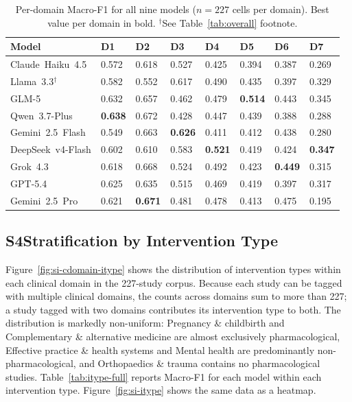 \documentclass[../main.tex]{subfiles}
\begin{document}
\begin{table}
\centering
\caption{Per-domain Macro-F1 for all nine models
($n = 227$ cells per domain). Best value per domain in bold.
$^\dag$See Table~\ref{tab:overall} footnote.}
\label{tab:domain-f1}
\begin{tabular}{lC{1.5cm}C{1.5cm}C{1.5cm}C{1.5cm}C{1.5cm}C{1.5cm}C{1.5cm}}
\toprule
Model & D1 & D2 & D3 & D4 & D5 & D6 & D7 \\
\midrule
Claude~Haiku~4.5       & 0.572 & 0.618 & 0.527          & 0.425 & 0.394 & 0.387 & 0.269 \\
Llama~3.3$^\dag$   & 0.582 & 0.552 & 0.617          & 0.490 & 0.435 & 0.397 & 0.329 \\
GLM-5                  & 0.632 & 0.657 & 0.462          & 0.479 & \textbf{0.514} & 0.443 & 0.345 \\
Qwen~3.7-Plus      & \textbf{0.638} & 0.672 & 0.428 & 0.447 & 0.439 & 0.388 & 0.288 \\
Gemini~2.5~Flash   & 0.549 & 0.663 & \textbf{0.626} & 0.411 & 0.412 & 0.438 & 0.280 \\
DeepSeek~v4-Flash  & 0.602 & 0.610 & 0.583          & \textbf{0.521} & 0.419 & 0.424 & \textbf{0.347} \\
Grok~4.3           & 0.618 & 0.668 & 0.524          & 0.492 & 0.423 & \textbf{0.449} & 0.315 \\
GPT-5.4            & 0.625 & 0.635 & 0.515          & 0.469 & 0.419 & 0.397 & 0.317 \\
Gemini~2.5~Pro     & 0.621 & \textbf{0.671} & 0.481  & 0.478 & 0.413 & 0.475 & 0.195 \\
\bottomrule
\end{tabular}
\end{table}

\subsection*{S4\quad Stratification by Intervention Type}
\label{sec:si-itype}

Figure~\ref{fig:si-cdomain-itype} shows the distribution of intervention types
within each clinical domain in the 227-study corpus.
Because each study can be tagged with multiple clinical domains, the counts
across domains sum to more than 227; a study tagged with two domains contributes
its intervention type to both.
The distribution is markedly non-uniform: Pregnancy \& childbirth and
Complementary \& alternative medicine are almost exclusively pharmacological,
Effective practice \& health systems and Mental health are predominantly
non-pharmacological, and Orthopaedics \& trauma contains no pharmacological
studies.
Table~\ref{tab:itype-full} reports Macro-F1 for each model within each intervention
type. Figure~\ref{fig:si-itype} shows the same data as a heatmap.
\end{document}
